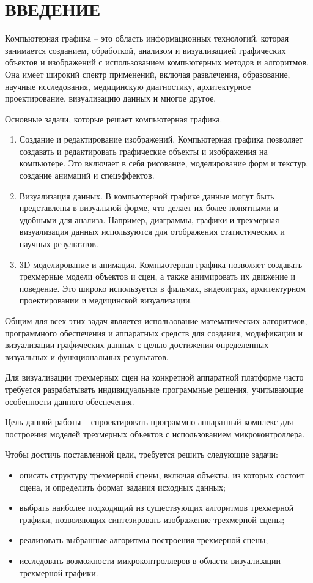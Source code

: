 \chapter*{ВВЕДЕНИЕ}

Компьютерная графика -- это область информационных технологий, которая занимается созданием, обработкой, анализом и визуализацией графических объектов и изображений с использованием компьютерных методов и алгоритмов. 
Она имеет широкий спектр применений, включая развлечения, образование, научные исследования, медицинскую диагностику, архитектурное проектирование, визуализацию данных и многое другое.

Основные задачи, которые решает компьютерная графика.
\begin{enumerate}[label={\arabic*)}]
	\item Создание и редактирование изображений. 
    Компьютерная графика позволяет создавать и редактировать графические объекты и изображения на компьютере. 
    Это включает в себя рисование, моделирование форм и текстур, создание анимаций и спецэффектов.
    \item Визуализация данных. 
    В компьютерной графике данные могут быть представлены в визуальной форме, что делает их более понятными и удобными для анализа. 
    Например, диаграммы, графики и трехмерная визуализация данных используются для отображения статистических и научных результатов.
    \item 3D-моделирование и анимация. 
    Компьютерная графика позволяет создавать трехмерные модели объектов и сцен, а также анимировать их движение и поведение. 
    Это широко используется в фильмах, видеоиграх, архитектурном проектировании и медицинской визуализации.
\end{enumerate}

Общим для всех этих задач является использование математических алгоритмов, программного обеспечения и аппаратных средств для создания, модификации и визуализации графических данных с целью достижения определенных визуальных и функциональных результатов.

Для визуализации трехмерных сцен на конкретной аппаратной платформе часто требуется разрабатывать индивидуальные программные решения, учитывающие особенности данного обеспечения.

Цель данной работы -- спроектировать программно-аппаратный комплекс для построения моделей трехмерных объектов с использованием микроконтроллера.

Чтобы достичь поставленной цели, требуется решить следующие задачи: 
\begin{itemize}
    \item описать структуру трехмерной сцены, включая объекты, из которых состоит сцена, и определить формат задания исходных данных;
    \item выбрать наиболее подходящий из существующих алгоритмов трехмерной графики, позволяющих синтезировать изображение трехмерной сцены;
    \item реализовать выбранные алгоритмы построения трехмерной сцены;
    \item исследовать возможности микроконтроллеров в области визуализации трехмерной графики.
\end{itemize}
